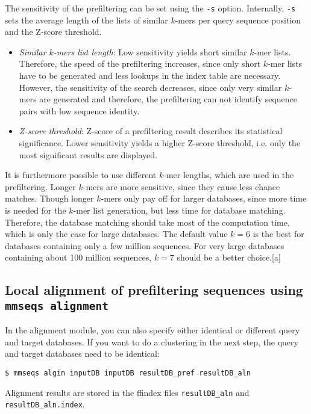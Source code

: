 \documentclass[11pt,a4paper]{scrreprt}
\begin{document}
The sensitivity of the prefiltering can be set using the \texttt{-s} option. Internally, \texttt{-s} sets the average length of the lists of similar $k$-mers per query sequence position and the Z-score threshold.


\begin{itemize}
\item \emph{Similar $k$-mers list length}: Low sensitivity yields short similar $k$-mer lists. Therefore, the speed of the prefiltering increases, since only short $k$-mer lists have to be generated and less lookups in the index table are necessary. However, the sensitivity of the search decreases, since only very similar $k$-mers are generated and therefore, the prefiltering can not identify sequence pairs with low sequence identity.
\item \emph{Z-score threshold}: Z-score of a prefiltering result describes its statistical significance. Lower sensitivity yields a higher Z-score threshold, i.e. only the most significant results are displayed.
\end{itemize}


It is furthermore possible to use different $k$-mer lengths, which are used in the prefiltering. Longer $k$-mers are more sensitive, since they cause less chance matches. Though longer $k$-mers only pay off for larger databases, since more time is needed for the $k$-mer list generation, but less time for database matching. Therefore, the database matching should take most of the computation time, which is only the case for large databases. The default value $k=6$ is the best for databases containing only a few million sequences. For very large databases containing about 100 million sequences, $k=7$ should be a better choice.[a]
\subsection{Local alignment of prefiltering sequences using \texttt{mmseqs alignment}}
In the alignment module, you can also specify either identical or different query and target databases. If you want to do a clustering in the next step, the query and target databases need to be identical:


\begin{verbatim}
$ mmseqs algin inputDB inputDB resultDB_pref resultDB_aln 
\end{verbatim}


Alignment results are stored in the ffindex files \texttt{resultDB\_aln} and \texttt{resultDB\_aln.index}.
\end{document}
